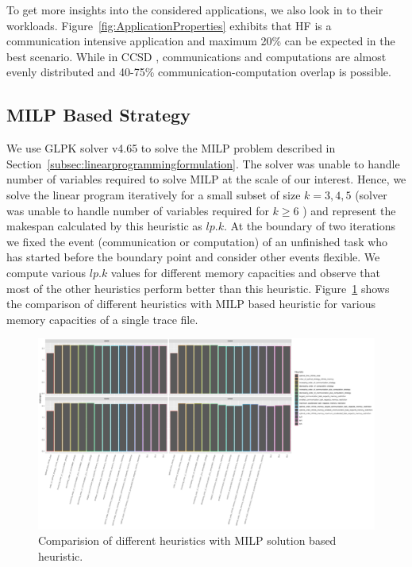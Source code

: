 \documentclass[runningheads]{llncs} %
\begin{document}
To get more insights into the considered applications, we also look in to their workloads. Figure~\ref{fig:ApplicationProperties} exhibits that HF is a communication intensive application and maximum 20\%  can be expected in the best scenario. While in CCSD , communications and computations are almost evenly distributed and  40-75\% communication-computation overlap is possible.


\subsection{MILP Based Strategy}
 We use GLPK solver v4.65 to solve the MILP problem described in Section~\ref{subsec:linearprogrammingformulation}. The solver was unable to handle number of variables required to solve MILP at the scale of our interest. Hence, we solve the linear program iteratively for a small subset of size $k=3,4,5$ (solver was unable to handle number of variables required for $k\ge6$ ) and represent the makespan calculated by this heuristic as $lp.k$. At the boundary of two iterations we fixed the event (communication or computation) of an unfinished task who has  started before the boundary point and consider other events flexible. We compute various  $lp.k$ values for different memory capacities and observe that most of the other heuristics perform better than this heuristic. Figure~\ref{fig:iterativeLpSolution} shows the comparison of different heuristics with MILP based heuristic for various memory capacities of a single trace file.

	\begin{figure}[htb]
	\includegraphics[scale=0.25]{../ExperimentalResults/makespan_with_lp.pdf}
	\caption{Comparision of different heuristics with MILP solution based heuristic.}
	\label{fig:iterativeLpSolution}
\end{figure}
\end{document}
